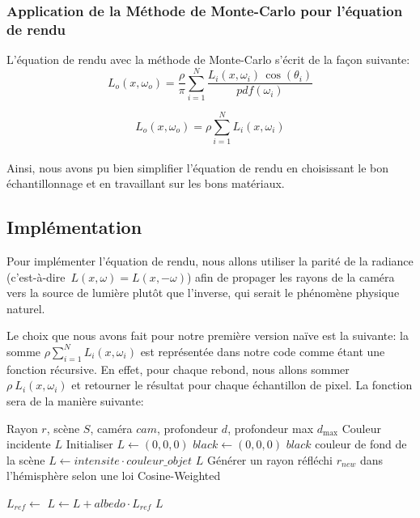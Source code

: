 \subsubsection{Application de la Méthode de Monte-Carlo pour l'équation de rendu}

L'équation de rendu avec la méthode de Monte-Carlo s'écrit de la façon suivante:
\\
$$ 
L_o(x, \omega_o) = \frac\rho\pi \sum_{i=1}^N \frac{L_i(x, \omega_i) \, \cos\left(\theta_i\right)}{pdf(\omega_i)}
$$

$$ 
L_o(x, \omega_o) = \rho\sum_{i=1}^N {L_i(x, \omega_i)}
$$
\\

Ainsi, nous avons pu bien simplifier l'équation de rendu en choisissant le bon échantillonnage et en travaillant sur les bons matériaux.

\subsection{Implémentation}
Pour implémenter l'équation de rendu, nous allons utiliser la parité de la radiance (c'est-à-dire $\, L(x,\omega) = L(x,-\omega)$) afin de propager les rayons de la caméra vers la source de lumière plutôt que l'inverse, qui serait le phénomène physique naturel.

Le choix que nous avons fait pour notre première version naïve est la suivante: la somme $\rho\sum_{i=1}^N {L_i(x, \omega_i)}$ est représentée dans notre code comme étant une fonction récursive. En effet, pour chaque rebond, nous allons sommer $\rho\ L_i(x, \omega_i)$ et retourner le résultat pour chaque échantillon de pixel. La fonction sera de la manière suivante:

\begin{algorithm}[H]
\caption{Échantillonnage récursif d'un rayon (RaySampling)}
\begin{algorithmic}[1]
\Require Rayon $r$, scène $S$, caméra $cam$, profondeur $d$, profondeur max $d_{\max}$
\Ensure Couleur incidente $L$
\State Initialiser $L \gets (0,0,0)$
\State $black \gets (0,0,0)$
    \State \Return $black$
\EndIf
{}
  \State \Return couleur de fond de la scène
\EndIf
{}
    \State $L \gets intensite \cdot couleur\_objet$
    \State \Return $L$
\EndIf
\State Générer un rayon réfléchi $r_{new}$ dans l'hémisphère selon une loi Cosine-Weighted

\State $L_{ref} \gets$ 
\State$L \gets L+albedo \cdot L_{ref}$
\State \Return $L$

\end{algorithmic}
\end{algorithm}



\pagebreak
